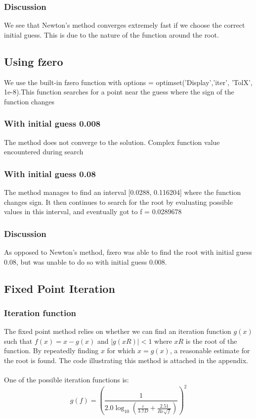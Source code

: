 \documentclass{book}
\begin{document}
    \subsubsection{Discussion}
    We see that Newton's method converges extremely fast if we choose the correct initial guess. This is due to the nature of the function around the root.
    \subsection{Using fzero}
    We use the built-in fzero function with options = optimset('Display','iter', 'TolX', 1e-8).This function searches for a point near the guess where the sign of the function changes
    \subsubsection{With initial guess 0.008}
    The method does not converge to the solution. Complex function value encountered during search
    \subsubsection{With initial guess 0.08}
    The method manages to find an interval [0.0288, 0.116204] where the function changes sign. It then continues to search for the root by evaluating possible values in this interval, and eventually got to f = 0.0289678 
    \subsubsection{Discussion}
    As opposed to Newton's method, fzero was able to find the root with initial guess 0.08, but was unable to do so with initial guess 0.008.
    \subsection{Fixed Point Iteration}
    \subsubsection{Iteration function}
    The fixed point method relies on whether we can find an iteration function ${g(x)}$ such that ${f(x) = x - g(x)}$ and ${|g(xR)| < 1}$ where ${xR}$ is the root of the function. By repeatedly finding ${x}$ for which ${x = g(x)}$, a reasonable estimate for the root is found. The code illustrating this method is attached in the appendix.\\
    \\
    One of the possible iteration functions is: \\
    \[ g(f) = \left(\frac{1}{2.0 \log_{10} \left(\frac{\varepsilon}{3.7D} + \frac{2.51}{\textit{Re}\sqrt{f}}\right)}\right)^2 \]
\end{document}
